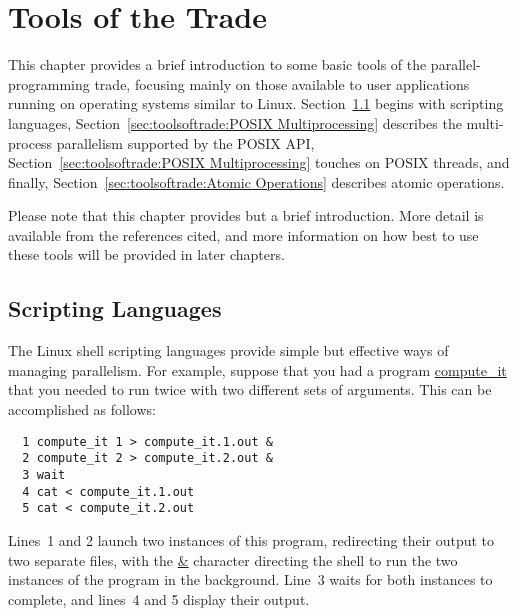 
\chapter{Tools of the Trade}
\label{chp:Tools of the Trade}


This chapter provides a brief introduction to some basic tools of the
parallel-programming trade, focusing mainly on those available to
user applications running on operating systems similar to Linux.
Section~\ref{sec:toolsoftrade:Scripting Languages} begins with
scripting languages,
Section~\ref{sec:toolsoftrade:POSIX Multiprocessing}
describes the multi-process parallelism supported by the POSIX API,
Section~\ref{sec:toolsoftrade:POSIX Multiprocessing} touches on POSIX threads,
and finally,
Section~\ref{sec:toolsoftrade:Atomic Operations}
describes atomic operations.

Please note that this chapter provides but a brief introduction.
More detail is available from the references cited, and more information
on how best to use these tools will be provided in later chapters.

\section{Scripting Languages}
\label{sec:toolsoftrade:Scripting Languages}

The Linux shell scripting languages provide simple but effective ways
of managing parallelism.
For example, suppose that you had a program \url{compute_it}
that you needed to run twice with two different sets of arguments.
This can be accomplished as follows:

\vspace{5pt}
\begin{minipage}[t]{\columnwidth}
\begin{verbatim}
  1 compute_it 1 > compute_it.1.out &
  2 compute_it 2 > compute_it.2.out &
  3 wait
  4 cat < compute_it.1.out
  5 cat < compute_it.2.out
\end{verbatim}
\end{minipage}
\vspace{5pt}

Lines~1 and 2 launch two instances of this program, redirecting their
output to two separate files, with the \url{&} character directing the
shell to run the two instances of the program in the background.
Line~3 waits for both instances to complete, and lines~4 and 5
display their output.

